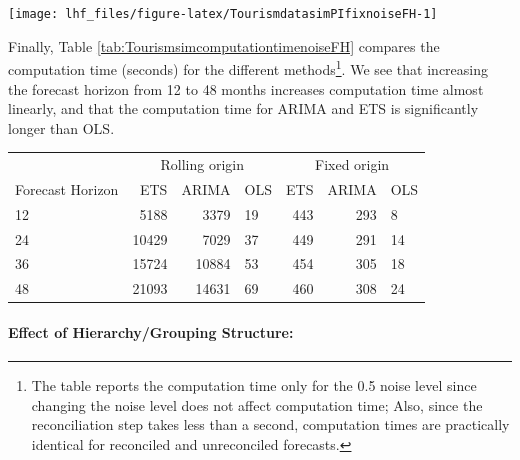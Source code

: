 \documentclass[11pt,a4paper,]{article}
\let\origfigure\figure
\let\endorigfigure\endfigure
\renewenvironment{figure}[1][2] {
    \expandafter\origfigure\expandafter[!htbp]
} {
    \endorigfigure
}
\let\origtable\table
\let\endorigtable\endtable
\renewenvironment{table}[1][2] {
    \expandafter\origtable\expandafter[!htbp]
} {
    \endorigtable
}
\begin{document}
\begin{figure}

{\centering \texttt{[image: lhf\_files/figure-latex/TourismdatasimPIfixnoiseFH-1]} 

}

\caption{Comparing reconciled 'fixed origin' forecasts and prediction intervals for a sample bottom-level series across different error levels (different panels).}\label{fig:TourismdatasimPIfixnoiseFH}
\end{figure}

Finally, Table \ref{tab:TourismsimcomputationtimenoiseFH} compares the computation time (seconds) for the different methods\footnote{The table reports the computation time only for the 0.5 noise level since changing the noise level does not affect computation time; Also, since the reconciliation step takes less than a second, computation times are practically identical for reconciled and unreconciled forecasts.}. We see that increasing the forecast horizon from 12 to 48 months increases computation time almost linearly, and that the computation time for ARIMA and ETS is significantly longer than OLS.

\begin{table}

\caption{\label{tab:TourismsimcomputationtimenoiseFH}Computation time (seconds) for rolling and fixed origin reconciled forecasts using ETS, ARIMA and OLS, by horizon and for 0.5 error value, for 304 bottom-level series and 8 levels of hierarchy.}
\centering
\begin{tabular}[t]{lrrlrrl}
\toprule
\multicolumn{1}{c}{} & \multicolumn{3}{c}{Rolling origin} & \multicolumn{3}{c}{Fixed origin} \\
\cmidrule(l{3pt}r{3pt}){2-4} \cmidrule(l{3pt}r{3pt}){5-7}
Forecast Horizon & ETS & ARIMA & OLS & ETS & ARIMA & OLS\\
\midrule
12 & 5188 & 3379 & 19 & 443 & 293 & 8\\
24 & 10429 & 7029 & 37 & 449 & 291 & 14\\
36 & 15724 & 10884 & 53 & 454 & 305 & 18\\
48 & 21093 & 14631 & 69 & 460 & 308 & 24\\
\bottomrule
\end{tabular}
\end{table}

\paragraph{Effect of Hierarchy/Grouping Structure:}
\end{document}
